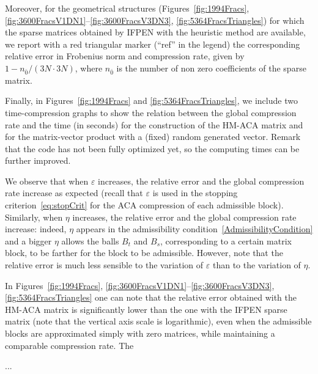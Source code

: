 Moreover, for the geometrical structures (Figures~\ref{fig:1994Fracs}, \ref{fig:3600FracsV1DN1}--\ref{fig:3600FracsV3DN3}, \ref{fig:5364FracsTriangles}) for which the sparse matrices obtained by IFPEN with the heuristic method are available, we report with a red triangular marker (``ref'' in the legend) the corresponding relative error in Frobenius norm and compression rate, given by $1- n_{\bar{0}}/(3N\cdot3N)$, where $n_{\bar{0}}$ is the number of non zero coefficients of the sparse matrix.

Finally, in Figures~\ref{fig:1994Fracs} and \ref{fig:5364FracsTriangles}, we include two time-compression graphs to show the relation between the global compression rate and the time (in seconds) for the construction of the HM-ACA matrix and for the matrix-vector product with a (fixed) random generated vector. Remark that the code has not been fully optimized yet, so the computing times can be further improved.  

\medskip
We observe that when $\varepsilon$ increases, the relative error and the global compression rate increase as expected (recall that $\varepsilon$ is used in the stopping criterion~\eqref{eq:stopCrit} for the ACA compression of each admissible block).
Similarly, when $\eta$ increases, the relative error and the global compression rate increase: indeed, $\eta$ appears in the admissibility condition~\eqref{AdmissibilityCondition} and a bigger $\eta$ allows the balls $B_t$ and $B_s$, corresponding to a certain matrix block, to be farther for the block to be admissible.
However, note that the relative error is much less sensible to the variation of $\varepsilon$ than to the variation of $\eta$.

In Figures~\ref{fig:1994Fracs}, \ref{fig:3600FracsV1DN1}--\ref{fig:3600FracsV3DN3}, \ref{fig:5364FracsTriangles} one can note that the relative error obtained with the HM-ACA matrix is significantly lower than the one with the IFPEN sparse matrix (note that the vertical axis scale is logarithmic), even when the admissible blocks are approximated simply with zero matrices, while maintaining a comparable compression rate. The 
 
... 









